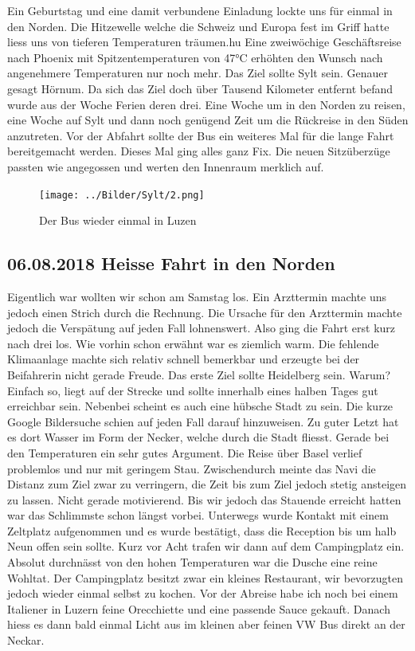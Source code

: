 Ein Geburtstag und eine damit verbundene Einladung lockte uns für einmal in den Norden.
Die Hitzewelle welche die Schweiz und Europa fest im Griff hatte liess uns von tieferen Temperaturen träumen.hu
Eine zweiwöchige Geschäftsreise nach Phoenix mit Spitzentemperaturen von 47°C erhöhten den Wunsch nach angenehmere Temperaturen nur noch mehr.
Das Ziel sollte Sylt sein.
Genauer gesagt Hörnum.
Da sich das Ziel doch über Tausend Kilometer entfernt befand wurde aus der Woche Ferien deren drei.
Eine Woche um in den Norden zu reisen, eine Woche auf Sylt und dann noch genügend Zeit um die Rückreise in den Süden anzutreten. 
Vor der Abfahrt sollte der Bus ein weiteres Mal für die lange Fahrt bereitgemacht werden.
Dieses Mal ging alles ganz Fix.
Die neuen Sitzüberzüge passten wie angegossen und werten den Innenraum merklich auf.

\begin{figure}[hb]
    \centering
    \texttt{[image: ../Bilder/Sylt/2.png]}
    \caption{Der Bus wieder einmal in Luzen}
    \label{img:Sylt}
\end{figure}

\newpage
\subsection{06.08.2018 Heisse Fahrt in den Norden} 
Eigentlich war wollten wir schon am Samstag los. Ein Arzttermin machte uns jedoch einen Strich durch die Rechnung.
Die Ursache für den Arzttermin machte jedoch die Verspätung auf jeden Fall lohnenswert.
Also ging die Fahrt erst kurz nach drei los.
Wie vorhin schon erwähnt war es ziemlich warm.
Die fehlende Klimaanlage machte sich relativ schnell bemerkbar und erzeugte bei der Beifahrerin nicht gerade Freude.
Das erste Ziel sollte Heidelberg sein.
Warum?
Einfach so, liegt auf der Strecke und sollte innerhalb eines halben Tages gut erreichbar sein.
Nebenbei scheint es auch eine hübsche Stadt zu sein. 
Die kurze Google Bildersuche schien auf jeden Fall darauf hinzuweisen.
Zu guter Letzt hat es dort Wasser im Form der Necker, welche durch die Stadt fliesst.
Gerade bei den Temperaturen ein sehr gutes Argument.
Die Reise über Basel verlief problemlos und nur mit geringem Stau.
Zwischendurch meinte das Navi die Distanz zum Ziel zwar zu verringern, die Zeit bis zum Ziel jedoch stetig ansteigen zu lassen.
Nicht gerade motivierend.
Bis wir jedoch das Stauende erreicht hatten war das Schlimmste schon längst vorbei.
Unterwegs wurde Kontakt mit einem Zeltplatz aufgenommen und es wurde bestätigt, dass die Reception bis um halb Neun offen sein sollte.
Kurz vor Acht trafen wir dann auf dem Campingplatz ein.
Absolut durchnässt von den hohen Temperaturen war die Dusche eine reine Wohltat.
Der Campingplatz besitzt zwar ein kleines Restaurant, wir bevorzugten jedoch wieder einmal selbst zu kochen.
Vor der Abreise habe ich noch bei einem Italiener in Luzern feine Orecchiette und eine passende Sauce gekauft.
Danach hiess es dann bald einmal Licht aus im kleinen aber feinen VW Bus direkt an der Neckar.

